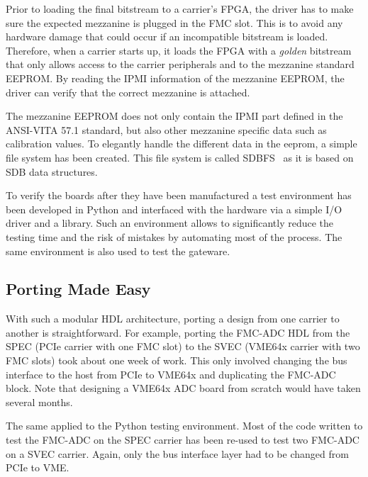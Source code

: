 \documentclass{JAC2003}
\begin{document}
Prior to loading the final bitstream to a carrier's FPGA, the driver has to make sure the expected mezzanine is plugged in the FMC slot.
This is to avoid any hardware damage that could occur if an incompatible bitstream is loaded.
Therefore, when a carrier starts up, it loads the FPGA with a \textit{golden} bitstream that only allows access to the carrier peripherals and to the mezzanine standard EEPROM.
By reading the IPMI information of the mezzanine EEPROM, the driver can verify that the correct mezzanine is attached.

The mezzanine EEPROM does not only contain the IPMI part defined in the ANSI-VITA 57.1 standard, but also other mezzanine specific data such as calibration values.
To elegantly handle the different data in the eeprom, a simple file system has been created.
This file system is called SDBFS~\cite{sdbfs} as it is based on SDB data structures.



To verify the boards after they have been manufactured a test environment has been developed in Python and interfaced with the hardware via a simple I/O driver and a library.
Such an environment allows to significantly reduce the testing time and the risk of mistakes by automating most of the process.
The same environment is also used to test the gateware.

\subsection{Porting Made Easy}
With such a modular HDL architecture, porting a design from one carrier to another is straightforward.
For example, porting the FMC-ADC HDL from the SPEC (PCIe carrier with one FMC slot) to the SVEC (VME64x carrier with two FMC slots) took about one week of work.
This only involved changing the bus interface to the host from PCIe to VME64x and duplicating the FMC-ADC block.
Note that designing a VME64x ADC board from scratch would have taken several months.

The same applied to the Python testing environment.
Most of the code written to test the FMC-ADC on the SPEC carrier has been re-used to test two FMC-ADC on a SVEC carrier.
Again, only the bus interface layer had to be changed from PCIe to VME.
\end{document}
